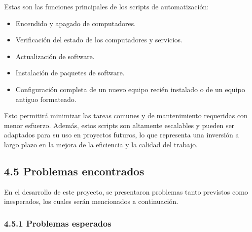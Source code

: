 \begin{spacing}{1.5}
  Estas son las funciones principales de los scripts de automatización:

  \begin{itemize}
    \item Encendido y apagado de computadores.
    \item Verificación del estado de los computadores y servicios.
    \item Actualización de software.
    \item Instalación de paquetes de software.
    \item Configuración completa de un nuevo equipo recién instalado o de
          un equipo antiguo formateado.
  \end{itemize}

  Esto permitirá minimizar las tareas comunes y de mantenimiento requeridas
  con menor esfuerzo. Además, estos scripts son altamente escalables y pueden
  ser
  adaptados para su uso en proyectos futuros, lo que representa una inversión a
  largo plazo en la mejora de la eficiencia y la calidad del trabajo.\cite{github}

  \subsection{4.5 Problemas encontrados}
  En el desarrollo de este proyecto, se presentaron problemas tanto previstos
  como inesperados, los cuales serán mencionados a continuación.

  \subsubsection{4.5.1 Problemas esperados}


\end{spacing}
